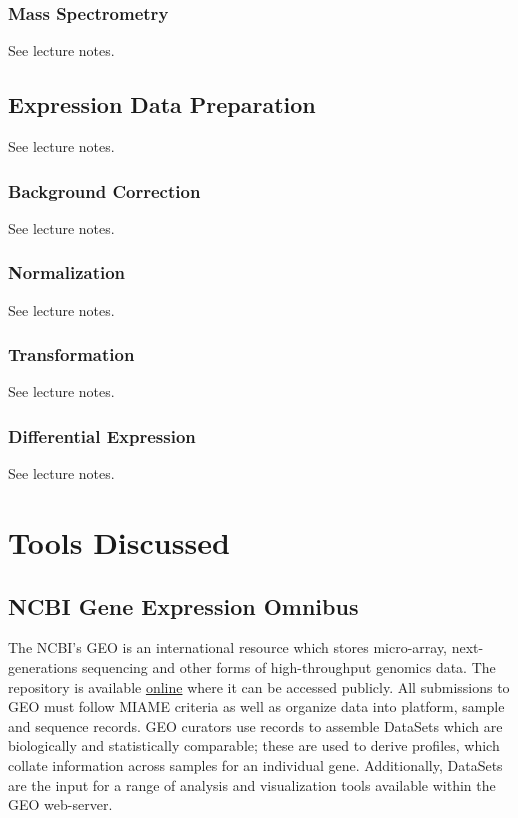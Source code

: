         \subsubsection{Mass Spectrometry }
        See lecture notes.\autocite{T9}
    
    \subsection{Expression Data Preparation}
    See lecture notes.\autocite{T9}

        \subsubsection{Background Correction}
        See lecture notes.\autocite{T9}

        \subsubsection{Normalization}
        See lecture notes.\autocite{T9}

        \subsubsection{Transformation}
        See lecture notes.\autocite{T9}

        \subsubsection{Differential Expression}
        See lecture notes.\autocite{T9}

\section{Tools Discussed}

    \subsection{NCBI Gene Expression Omnibus }

    The NCBI’s GEO is an international resource which stores micro-array, next-generations sequencing and other forms of high-throughput genomics data. The repository is available \href{https://www.ncbi.nlm.nih.gov/geo/}{online} where it can be accessed publicly.\autocite{B20} All submissions to GEO must follow MIAME criteria as well as organize data into platform, sample and sequence records.\autocite{B20} GEO curators use records to assemble DataSets which are biologically and statistically comparable; these are used to derive profiles, which collate information across samples for an individual gene.\autocite{B20} Additionally, DataSets are the input for a range of analysis and visualization tools available within the GEO web-server.\autocite{B20}

